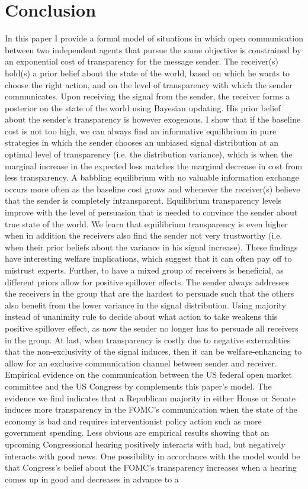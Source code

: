 \documentclass[paper=a4,12pt,DIV=11,twoside=false]{scrartcl}
\begin{document}
\section{Conclusion}

In this paper I provide a formal model of situations in which open communication between two independent agents that pursue the same objective is constrained by an exponential cost of transparency for the message sender. The receiver(s) hold(s) a prior belief about the state of the world, based on which he wants to choose the right action, and on the level of transparency with which the sender communicates. Upon receiving the signal from the sender, the receiver forms a posterior on the state of the world using Bayesian updating. His prior belief about the sender's transparency is however exogenous. I show that if the baseline cost is not too high, we can always find an informative equilibrium in pure strategies in which the sender chooses an unbiased signal distribution at an optimal level of transparency (i.e. the distribution variance), which is when the marginal increase in the expected loss matches the marginal decrease in cost from less transparency. A babbling equilibrium with no valuable information exchange occurs more often as the baseline cost grows and whenever the receiver(s) believe that the sender is completely intransparent. Equilibrium transparency levels improve with the level of persuasion that is needed to convince the sender about true state of the world. We learn that equilibrium transparency is even higher when in addition the receivers also find the sender not very trustworthy (i.e. when their prior beliefs about the variance in his signal increase). These findings have interesting welfare implications, which suggest that it can often pay off to mistrust experts. Further, to have a mixed group of receivers is beneficial, as different priors allow for positive spillover effects. The sender always addresses the receivers in the group that are the hardest to persuade such that the others also benefit from the lower variance in the signal distribution. Using majority instead of unanimity rule to decide about what action to take weakens this positive spillover effect, as now the sender no longer has to persuade all receivers in the group. At last, when transparency is costly due to negative externalities that the non-exclusivity of the signal induces, then it can be welfare-enhancing to allow for an exclusive communication channel between sender and receiver. Empirical evidence on the communication between the US federal open market committee and the US Congress by \citet{GL2017} complements this paper's model. The evidence we find indicates that a Republican majority in either House or Senate induces more transparency in the FOMC's communication when the state of the economy is bad and requires interventionist policy action such as more government spending. Less obvious are empirical results showing that an upcoming Congressional hearing positively interacts with bad, but negatively interacts with good news. One possibility in accordance with the model would be that Congress's belief about the FOMC's transparency increases when a hearing comes up in good and decreases in advance to a 
\end{document}
